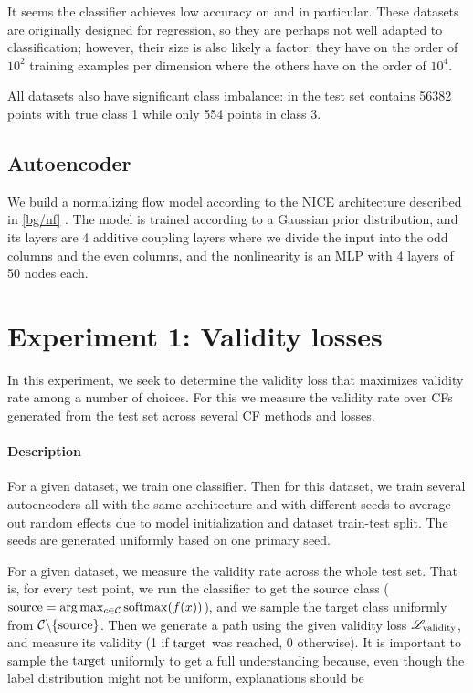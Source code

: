 \documentclass[../main.tex]{subfiles}
\begin{document}
It seems the classifier achieves low accuracy on \WineQuality{} and \OnlineNewsPopularity{} in particular.
These datasets are originally designed for regression, so they are perhaps not well adapted to classification; however, their size is also likely a factor: they have on the order of $10^2$ training examples per dimension where the others have on the order of $10^4$.

All datasets also have significant class imbalance: in \ForestCover{} the test set contains 56382 points with true class 1 while only 554 points in class 3.

\subsection{Autoencoder}

We build a normalizing flow model according to the NICE architecture described in \autoref{bg/nf} \cite{dinhNICE2015}.
The model is trained according to a Gaussian prior distribution, and its layers are 4 additive coupling layers where we divide the input into the odd columns and the even columns, and the nonlinearity is an MLP with 4 layers of 50 nodes each. 

\section{Experiment 1: Validity losses}

In this experiment, we seek to determine the validity loss that maximizes validity rate among a number of choices.
For this we measure the validity rate over CFs generated from the test set across several CF methods and losses.

\paragraph{Description}
\label{validity_losses/description}

For a given dataset, we train one classifier.
Then for this dataset, we train several autoencoders all with the same architecture and with different seeds to average out random effects due to model initialization and dataset train-test split.
The seeds are generated uniformly based on one primary seed.

For a given dataset, we measure the validity rate across the whole test set.
That is, for every test point, we run the classifier to get the $\mathrm{source}$ class ($\mathrm{source} = \arg\max_{c \in \mathcal{C}} \mathrm{softmax}( f(x) )$), and we sample the target class uniformly from $\mathcal{C} \backslash \{\mathrm{source}\}$.
Then we generate a path using the given validity loss $\mathscr{L}_\text{validity}$, and measure its validity (1 if $\mathrm{target}$ was reached, 0 otherwise).
It is important to sample the $\mathrm{target}$ uniformly to get a full understanding because, even though the label distribution might not be uniform, explanations should be
\end{document}
